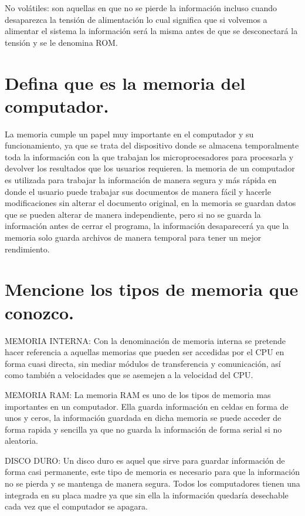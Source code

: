 \documentclass{article}
\begin{document}
No volátiles: son aquellas en que no se pierde la información incluso cuando desaparezca la tensión de alimentación lo cual significa que si volvemos a alimentar el sistema la información será la misma antes de que se desconectará la tensión y se le denomina ROM. 


\section{Defina que es la memoria del computador.}

La memoria cumple un papel muy importante en el computador y su funcionamiento, ya que se trata del dispositivo donde se almacena temporalmente toda la información con la que trabajan
los microprocesadores para procesarla y devolver los resultados que los usuarios requieren.
la memoria de un computador es utilizada para trabajar la información de manera segura y más rápida en donde el usuario puede trabajar sus documentos de manera fácil y hacerle modificaciones sin alterar el documento original, en la memoria se guardan datos que se pueden alterar de manera independiente, pero si no se guarda la información antes de cerrar el programa, la información desaparecerá ya que la memoria solo guarda archivos de manera temporal para tener un mejor rendimiento.


\section{Mencione los tipos de memoria que conozco.} \label{contenido}

MEMORIA INTERNA: Con la denominación de memoria interna se pretende hacer referencia a aquellas memorias que pueden ser
accedidas por el CPU en forma cuasi directa, sin mediar módulos de transferencia y comunicación, así como también
a velocidades que se asemejen a la velocidad del CPU.


MEMORIA RAM: La memoria RAM es uno de los tipos de memoria mas
importantes en un computador. Ella guarda información en celdas en forma de unos y ceros, la información guardada en dicha memoria se puede acceder de forma rapida y sencilla ya que no guarda la información de forma serial si no
aleatoria.

DISCO DURO: Un disco duro es aquel que sirve para guardar información de forma casi permanente, este tipo de memoria es necesario para que la información no se pierda y se mantenga de manera segura. Todos los computadores tienen una integrada en su placa madre ya que sin ella la información quedaría desechable cada vez que el computador se apagara.
\end{document}
